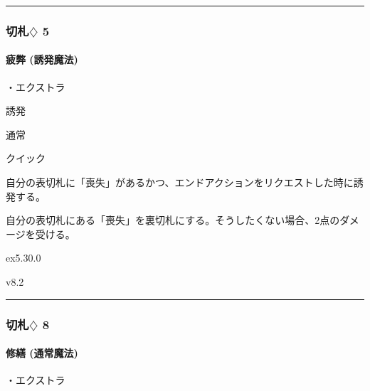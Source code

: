 \documentclass[letterpaper,10pt,dvipdfmx]{sphinxmanual}
\begin{document}
\bigskip\hrule\bigskip



\subsubsection{切札{\normalsize $\diamondsuit$} 5}
\label{\detokenize{auto/frameActionlist:id57}}

\paragraph{疲弊 (誘発魔法)}
\label{\detokenize{auto/frameActionlist:act-exhaust}}\label{\detokenize{auto/frameActionlist:id58}}
\sphinxAtStartPar
{}

\sphinxAtStartPar
・エクストラ

\sphinxAtStartPar
{} 誘発

\sphinxAtStartPar
{} 通常

\sphinxAtStartPar
{} クイック

\sphinxAtStartPar
{}

\sphinxAtStartPar
自分の表切札に「喪失」があるかつ、エンドアクションをリクエストした時に誘発する。

\sphinxAtStartPar
{}

\sphinxAtStartPar
自分の表切札にある「喪失」を裏切札にする。そうしたくない場合、2点のダメージを受ける。

\sphinxAtStartPar
{}  ex5.30.0

\sphinxAtStartPar
{}  v8.2


\bigskip\hrule\bigskip



\subsubsection{切札{\normalsize $\diamondsuit$} 8}
\label{\detokenize{auto/frameActionlist:id59}}

\paragraph{修繕 (通常魔法)}
\label{\detokenize{auto/frameActionlist:act-repair}}\label{\detokenize{auto/frameActionlist:id60}}
\sphinxAtStartPar
{}

\sphinxAtStartPar
・エクストラ
\end{document}
